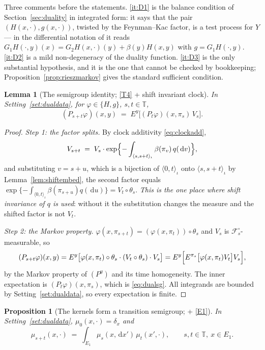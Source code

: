 \documentclass[11pt,a4paper]{article}
\theoremstyle{plain}
\newtheorem{lemma}[theorem]{Lemma}
\newtheorem{proposition}[theorem]{Proposition}
\theoremstyle{definition}
\theoremstyle{remark}
\newcommand{\T}{\mathbb{T}}                     %
\newcommand{\Filt}{\mathcal{F}}
\newcommand{\DGP}{\cite{DGP24}}
\newcommand{\dif}{\,\mathrm{d}}
\begin{document}
Three comments before the statements.  \ref{it:D1} is the balance condition of
Section~\ref{sec:duality} in integrated form: it says that the pair
$(H(x,\cdot), g(x,\cdot))$, twisted by the Feynman--Kac factor, is a test process
for $Y$ --- in the differential notation of \DGP{} it reads
$G_1 H(\cdot,y)(x) = G_2 H(x,\cdot)(y) + \beta(y)H(x,y)$ with
$g = G_1H(\cdot,y)$.  \ref{it:D2} is a mild non-degeneracy of the duality
function.  \ref{it:D3} is the only substantial hypothesis, and it is the one that
cannot be checked by bookkeeping; Proposition~\ref{prop:rieszmarkov} gives the
standard sufficient condition.

\begin{lemma}[The semigroup identity; \eqref{T4} + shift invariant clock]
  \label{lem:dualsemigroup}
  In Setting~\ref{set:dualdata}, for $\varphi \in \{H,g\}$, $s,t \in \T$,
  \begin{equation}
    \label{eq:dualsg}
    (P_{s+t}\varphi)(x,y) \;=\; E^y\bigl[ (P_t\varphi)(x,\pi_s) \, V_s \bigr] .
  \end{equation}
\end{lemma}

\begin{proof}
  \emph{Step 1: the factor splits.}  By clock additivity \eqref{eq:clockadd},
  \[
    V_{s+t} \;=\; V_s \cdot
      \exp\Bigl\{ -\int_{\langle s,s+t\rangle_\iota} \beta(\pi_v) \, q(\dif v) \Bigr\} ,
  \]
  and substituting $v = s+u$, which is a bijection of $\langle 0,t\rangle_\iota$
  onto $\langle s,s+t\rangle_\iota$ by Lemma~\ref{lem:shiftembed}, the second
  factor equals
  $\exp\{-\int_{\langle 0,t\rangle_\iota}\beta(\pi_{s+u}) q(\dif u)\} = V_t \circ \theta_s$.
  \emph{This is the one place where shift invariance of $q$ is used}: without it
  the substitution changes the measure and the shifted factor is not $V_t$.

  \emph{Step 2: the Markov property.}  $\varphi(x,\pi_{s+t}) = (\varphi(x,\pi_t))\circ\theta_s$
  and $V_s$ is $\Filt^\circ_s$-measurable, so
  \[
    (P_{s+t}\varphi)(x,y)
      = E^y\bigl[ \varphi(x,\pi_t)\circ\theta_s \cdot (V_t\circ\theta_s) \cdot V_s \bigr]
      = E^y\Bigl[ E^{\pi_s}\bigl[ \varphi(x,\pi_t) V_t \bigr] V_s \Bigr] ,
  \]
  by the Markov property of $(P^y)$ and its time homogeneity.  The inner
  expectation is $(P_t\varphi)(x,\pi_s)$, which is \eqref{eq:dualsg}.  All
  integrands are bounded by Setting~\ref{set:dualdata}, so every expectation is
  finite.
\end{proof}

\begin{proposition}[The kernels form a transition semigroup; + \eqref{E1}]
  \label{prop:dualCK}
  In Setting~\ref{set:dualdata}, $\mu_0(x,\cdot) = \delta_x$ and
  \begin{equation}
    \label{eq:dualCK}
    \mu_{s+t}(x,\cdot) \;=\; \int_{E_1} \mu_s(x,\dif x') \, \mu_t(x',\cdot) ,
    \qquad s,t \in \T, \ x \in E_1 .
  \end{equation}
\end{proposition}
\end{document}
